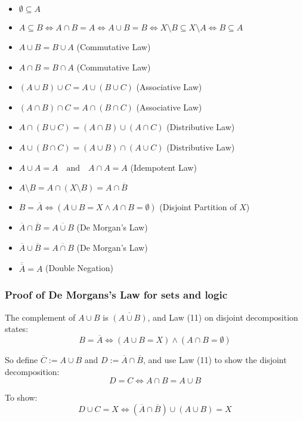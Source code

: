 \begin{itemize}[label=\(-\)]
	\item \(\emptyset \subseteq A\)
	\item \(A \subseteq B \iff A \cap B = A \iff A \cup B = B \iff X \setminus B \subseteq X \setminus A \iff B \subseteq A\)
	\item \(A \cup B = B \cup A\) \hfill (Commutative Law)
	\item \(A \cap B = B \cap A\) \hfill (Commutative Law)
	\item \((A \cup B) \cup C = A \cup (B \cup C)\) \hfill (Associative Law)
	\item \((A \cap B) \cap C = A \cap (B \cap C)\) \hfill (Associative Law)
	\item \(A \cap (B \cup C) = (A \cap B) \cup (A \cap C)\) \hfill (Distributive Law)
	\item \(A \cup (B \cap C) = (A \cup B) \cap (A \cup C)\) \hfill (Distributive Law)
	\item \(A \cup A = A \quad \text{and} \quad A \cap A = A\) \hfill (Idempotent Law)
	\item \(A \setminus B = A \cap (X \setminus B) = A \cap \overline{B}\)
	\item \(B = \overline{A} \iff (A \cup B = X \land A \cap B = \emptyset)\) \hfill (Disjoint Partition of \(X\))
	\item \(\overline{A} \cap \overline{B} = \overline{A \cup B}\) \hfill (De Morgan's Law)
	\item \(\overline{A} \cup \overline{B} = \overline{A \cap B}\) \hfill (De Morgan's Law)
	\item \(\overline{\overline{A}} = A\) \hfill (Double Negation)
\end{itemize}

\subsubsection{Proof of De Morgans's Law for sets and logic}
The complement of \( A \cup B \) is \( \overline{(A \cup B)} \), and Law (11) on disjoint decomposition states:
\[
	B = \overline{A} \iff (A \cup B = X) \land (A \cap B = \emptyset)
\]

So define \( \overline{C} := A \cup B \) and \( D := \overline{A} \cap \overline{B} \),
and use Law (11) to show the disjoint decomposition:
\[
	D = C \iff A \cap B = A \cup B
\]

To show:
\[
	D \cup C = X \iff (\overline{A} \cap \overline{B}) \cup (A \cup B) = X
\]

